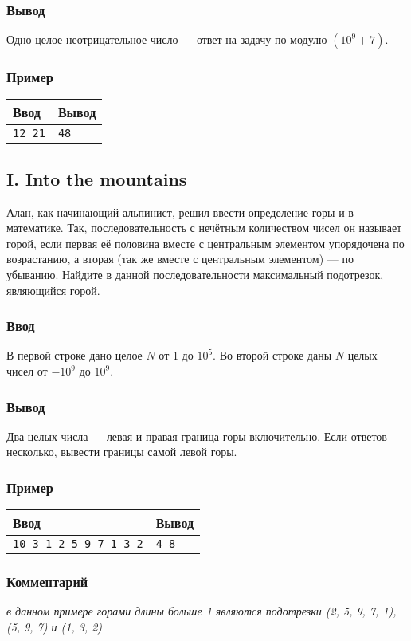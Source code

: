 \documentclass[10pt, a4paper]{article}
\newcommand{\informat}[1]
{
	\subsubsection*{Ввод} #1
}
\newcommand{\outformat}[1]
{
	\subsubsection*{Вывод} #1
}
\newcommand{\example}[2]
{
	\subsubsection*{Пример}
	\noindent
	\begin{center}
	\begin{tabularx}{\linewidth}{|X|X|}
	\hline
	Ввод & Вывод \\
	\hline
	{\tt #1} & {\tt #2}		\\
	\hline
	\end{tabularx}
	\end{center}
}
\newcommand{\excomm}[1]
{
	\subsubsection*{Комментарий}
	\textit{#1}
}
\begin{document}
\outformat{Одно целое неотрицательное число --- ответ на задачу по модулю $(10^9 + 7)$.}

\example{12 21}{48}

\newpage

\subsection*{I. Into the mountains}

Алан, как начинающий альпинист, решил ввести определение горы и в математике. Так, последовательность с нечётным количеством чисел он называет горой, если первая её половина вместе с центральным элементом упорядочена по возрастанию, а вторая (так же вместе с центральным элементом) --- по убыванию. Найдите в данной последовательности максимальный подотрезок, являющийся горой.

\informat{В первой строке дано целое $N$ от 1 до $10^5$. Во второй строке даны $N$ целых чисел от $-10^9$ до $10^9$.}

\outformat{Два целых числа --- левая и правая граница горы включительно. Если ответов несколько, вывести границы самой левой горы.}

\example{10\newline
5 3 1 2 5 9 7 1 3 2}{4 8}

\excomm{в данном примере горами длины больше 1 являются подотрезки (2, 5, 9, 7, 1), (5, 9, 7) и (1, 3, 2)}
\end{document}
